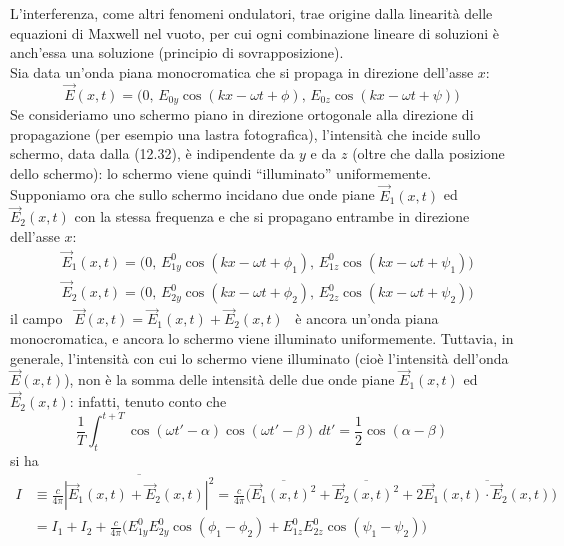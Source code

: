 L'interferenza, come altri fenomeni ondulatori, trae origine dalla linearit\`a
delle equazioni di Maxwell nel vuoto, per cui ogni combinazione lineare di
soluzioni \`e anch'essa una soluzione (principio di sovrapposizione).\\
Sia data un'onda piana monocromatica che si propaga in direzione dell'asse $x$:
\begin{equation}
  \vec E(x,t)
  =\big(0,\,E_{0y}\cos(kx-\omega t+\phi),\,E_{0z}\cos(kx-\omega t+\psi)\big)
  \tag{13.1}
\end{equation}
Se consideriamo uno schermo piano in direzione ortogonale alla direzione di
propagazione (per esempio una lastra fotografica), l'intensit\`a che incide
sullo schermo, data dalla (12.32), \`e indipendente da $y$ e da $z$ (oltre che
dalla posizione dello schermo): lo schermo viene quindi ``illuminato''
uniformemente.\\
Supponiamo ora che sullo schermo incidano due onde piane $\vec E_1(x,t)$ ed
$\vec E_2(x,t)$ con la stessa frequenza e che si propagano entrambe in direzione
dell'asse $x$:
\begin{equation}
  \begin{aligned}
    &\vec E_1(x,t)=\big(0,\,E_{1y}^0\cos(kx-\omega t+\phi_1),
    \,E_{1z}^0\cos(kx-\omega t+\psi_1)\big)\\
    &\vec E_2(x,t)=\big(0,\,E_{2y}^0\cos(kx-\omega t+\phi_2),
    \,E_{2z}^0\cos(kx-\omega t+\psi_2)\big)
  \end{aligned}
  \tag{13.2}
\end{equation}
il campo \ $\vec E(x,t)=\vec E_1(x,t)+\vec E_2(x,t)$ \ \`e ancora un'onda piana
monocromatica, e ancora lo schermo viene illuminato uniformemente. Tuttavia, in
generale, l'intensit\`a con cui lo schermo viene illuminato \big(cio\`e
l'intensit\`a dell'onda $\vec E(x,t)$\big), non \`e la somma delle intensit\`a
delle due onde piane $\vec E_1(x,t)$ ed $\vec E_2(x,t)$: infatti, tenuto conto
che
\begin{equation}
  \frac{1}{T}\int_t^{t+T}\cos(\omega t'-\alpha)\cos(\omega t'-\beta)\,dt'
  =\frac{1}{2}\cos(\alpha-\beta)
  \tag{13.3}
\end{equation}
si ha
\begin{equation}
  \begin{aligned}
    I&\equiv\frac{c}{4\pi}\overline{|\vec E_1(x,t)+\vec E_2(x,t)|^2}
    =\frac{c}{4\pi}\Big(\overline{\vec E_1(x,t)^2}+\overline{\vec E_2(x,t)^2}
    +2\overline{\vec E_1(x,t)\cdot\vec E_2(x,t)}\Big)\\
    &=I_1+I_2+\frac{c}{4\pi}\big(E_{1y}^0E_{2y}^0\cos(\phi_1-\phi_2)
    +E_{1z}^0E_{2z}^0\cos(\psi_1-\psi_2)\big)
  \end{aligned}
  \tag{13.4}
\end{equation}
